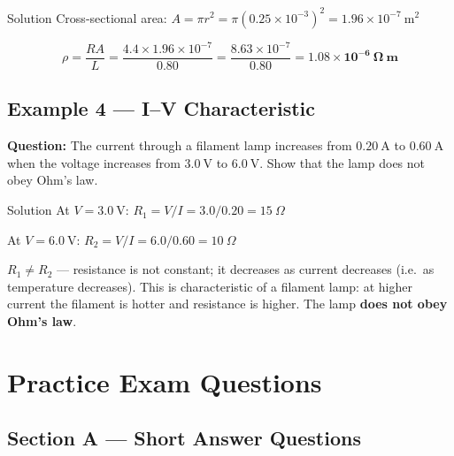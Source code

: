 \begin{examplebox}{Solution}
Cross-sectional area: $A = \pi r^2 = \pi(0.25\times10^{-3})^2 = 1.96\times10^{-7}\ \text{m}^2$

$$\rho = \frac{RA}{L} = \frac{4.4 \times 1.96\times10^{-7}}{0.80} = \frac{8.63\times10^{-7}}{0.80} = \mathbf{1.08\times10^{-6}\ \Omega\ \text{m}}$$
\end{examplebox}

\subsection*{Example 4 — I--V Characteristic}

\textbf{Question:} The current through a filament lamp increases from $0.20\ \text{A}$ to $0.60\ \text{A}$ when the voltage increases from $3.0\ \text{V}$ to $6.0\ \text{V}$. Show that the lamp does not obey Ohm's law.

\begin{examplebox}{Solution}
At $V = 3.0\ \text{V}$: $R_1 = V/I = 3.0/0.20 = 15\ \Omega$

At $V = 6.0\ \text{V}$: $R_2 = V/I = 6.0/0.60 = 10\ \Omega$

$R_1 \neq R_2$ — resistance is not constant; it decreases as current decreases (i.e.\ as temperature decreases). This is characteristic of a filament lamp: at higher current the filament is hotter and resistance is higher. The lamp \textbf{does not obey Ohm's law}.
\end{examplebox}

\section{Practice Exam Questions}

\subsection*{Section A — Short Answer Questions}

